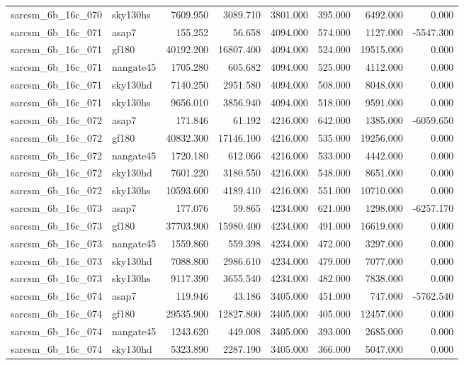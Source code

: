 \begin{tabular}{llrrrrrr}
sarcsm\_6b\_16c\_070 & sky130hs & 7609.950 & 3089.710 & 3801.000 & 395.000 & 6492.000 & 0.000 \\
sarcsm\_6b\_16c\_071 & asap7 & 155.252 & 56.658 & 4094.000 & 574.000 & 1127.000 & -5547.300 \\
sarcsm\_6b\_16c\_071 & gf180 & 40192.200 & 16807.400 & 4094.000 & 524.000 & 19515.000 & 0.000 \\
sarcsm\_6b\_16c\_071 & nangate45 & 1705.280 & 605.682 & 4094.000 & 525.000 & 4112.000 & 0.000 \\
sarcsm\_6b\_16c\_071 & sky130hd & 7140.250 & 2951.580 & 4094.000 & 508.000 & 8048.000 & 0.000 \\
sarcsm\_6b\_16c\_071 & sky130hs & 9656.010 & 3856.940 & 4094.000 & 518.000 & 9591.000 & 0.000 \\
sarcsm\_6b\_16c\_072 & asap7 & 171.846 & 61.192 & 4216.000 & 642.000 & 1385.000 & -6059.650 \\
sarcsm\_6b\_16c\_072 & gf180 & 40832.300 & 17146.100 & 4216.000 & 535.000 & 19256.000 & 0.000 \\
sarcsm\_6b\_16c\_072 & nangate45 & 1720.180 & 612.066 & 4216.000 & 533.000 & 4442.000 & 0.000 \\
sarcsm\_6b\_16c\_072 & sky130hd & 7601.220 & 3180.550 & 4216.000 & 548.000 & 8651.000 & 0.000 \\
sarcsm\_6b\_16c\_072 & sky130hs & 10593.600 & 4189.410 & 4216.000 & 551.000 & 10710.000 & 0.000 \\
sarcsm\_6b\_16c\_073 & asap7 & 177.076 & 59.865 & 4234.000 & 621.000 & 1298.000 & -6257.170 \\
sarcsm\_6b\_16c\_073 & gf180 & 37703.900 & 15980.400 & 4234.000 & 491.000 & 16619.000 & 0.000 \\
sarcsm\_6b\_16c\_073 & nangate45 & 1559.860 & 559.398 & 4234.000 & 472.000 & 3297.000 & 0.000 \\
sarcsm\_6b\_16c\_073 & sky130hd & 7088.800 & 2986.610 & 4234.000 & 479.000 & 7077.000 & 0.000 \\
sarcsm\_6b\_16c\_073 & sky130hs & 9117.390 & 3655.540 & 4234.000 & 482.000 & 7838.000 & 0.000 \\
sarcsm\_6b\_16c\_074 & asap7 & 119.946 & 43.186 & 3405.000 & 451.000 & 747.000 & -5762.540 \\
sarcsm\_6b\_16c\_074 & gf180 & 29535.900 & 12827.800 & 3405.000 & 405.000 & 12457.000 & 0.000 \\
sarcsm\_6b\_16c\_074 & nangate45 & 1243.620 & 449.008 & 3405.000 & 393.000 & 2685.000 & 0.000 \\
sarcsm\_6b\_16c\_074 & sky130hd & 5323.890 & 2287.190 & 3405.000 & 366.000 & 5047.000 & 0.000 \\

\end{tabular}
